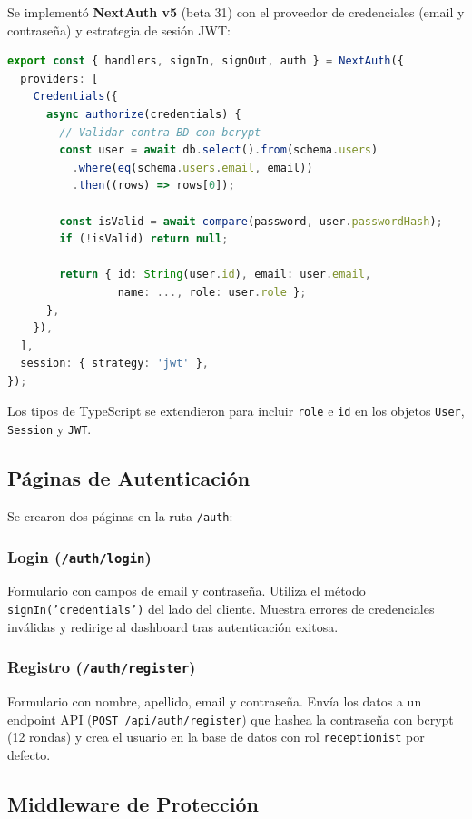 \documentclass[12pt,a4paper]{article}
\begin{document}
Se implementó \textbf{NextAuth v5} (beta 31) con el proveedor de credenciales
(email y contraseña) y estrategia de sesión JWT:

\begin{lstlisting}[language=TypeScript, caption=Configuración de NextAuth]
export const { handlers, signIn, signOut, auth } = NextAuth({
  providers: [
    Credentials({
      async authorize(credentials) {
        // Validar contra BD con bcrypt
        const user = await db.select().from(schema.users)
          .where(eq(schema.users.email, email))
          .then((rows) => rows[0]);

        const isValid = await compare(password, user.passwordHash);
        if (!isValid) return null;

        return { id: String(user.id), email: user.email,
                 name: ..., role: user.role };
      },
    }),
  ],
  session: { strategy: 'jwt' },
});
\end{lstlisting}

Los tipos de TypeScript se extendieron para incluir \texttt{role} e \texttt{id}
en los objetos \texttt{User}, \texttt{Session} y \texttt{JWT}.

\subsection{Páginas de Autenticación}

Se crearon dos páginas en la ruta \texttt{/auth}:

\subsubsection*{Login (\texttt{/auth/login})}
Formulario con campos de email y contraseña. Utiliza el método
\texttt{signIn('credentials')} del lado del cliente. Muestra errores de
credenciales inválidas y redirige al dashboard tras autenticación exitosa.

\subsubsection*{Registro (\texttt{/auth/register})}
Formulario con nombre, apellido, email y contraseña. Envía los datos a un
endpoint API (\texttt{POST /api/auth/register}) que hashea la contraseña con
bcrypt (12 rondas) y crea el usuario en la base de datos con rol
\texttt{receptionist} por defecto.

\subsection{Middleware de Protección}
\end{document}
